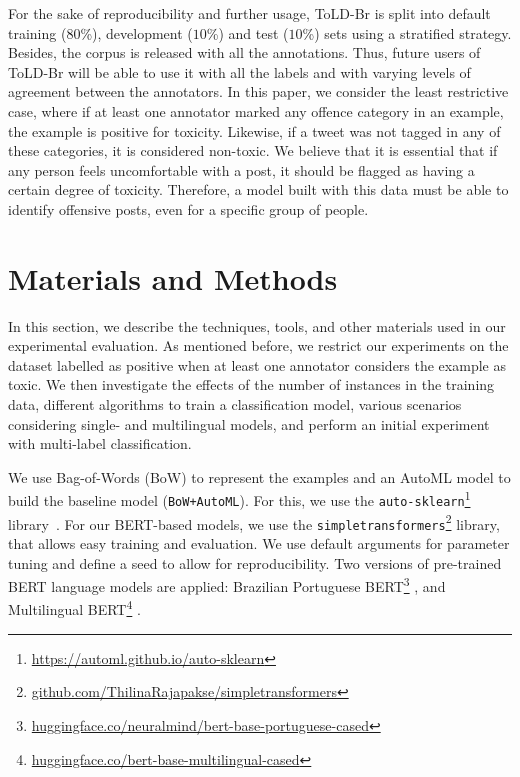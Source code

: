 \documentclass[11pt,a4paper]{article}
\begin{document}
For the sake of reproducibility and further usage, ToLD-Br is split into default training ($80$\%), development ($10$\%) and test ($10$\%) sets using a stratified strategy. Besides, the corpus is released with all the annotations. Thus, future users of ToLD-Br will be able to use it with all the labels and with varying levels of agreement between the annotators. In this paper, we consider the least restrictive case, where if at least one annotator marked any offence category in an example, the example is positive for toxicity. Likewise, if a tweet was not tagged in any of these categories, it is considered non-toxic. We believe that it is essential that if any person feels uncomfortable with a post, it should be flagged as having a certain degree of toxicity. Therefore, a model built with this data must be able to identify offensive posts, even for a specific group of people.

\section{Materials and Methods} \label{sec:materials}


In this section, we describe the techniques, tools, and other materials used in our experimental evaluation. As mentioned before, we restrict our experiments on the dataset labelled as positive when at least one annotator considers the example as toxic. We then investigate the effects of the number of instances in the training data, different algorithms to train a classification model, various scenarios considering single- and multilingual models, and perform an initial experiment with multi-label classification. 

We use Bag-of-Words (BoW) to represent the examples and an AutoML model to build the baseline model (\texttt{BoW+AutoML}). For this, we use the \texttt{auto-sklearn}\footnote{\url{https://automl.github.io/auto-sklearn}} library~\cite{feurer2019auto}. For our BERT-based models, we use the \texttt{simpletransformers}\footnote{\url{github.com/ThilinaRajapakse/simpletransformers}} library, that allows easy training and evaluation. We use default arguments for parameter tuning and define a seed to allow for reproducibility. Two versions of pre-trained BERT language models are applied: Brazilian Portuguese BERT\footnote{\url{huggingface.co/neuralmind/bert-base-portuguese-cased}} \cite{souza2019portuguese}, and Multilingual BERT\footnote{\url{huggingface.co/bert-base-multilingual-cased}} \cite{Wolf2019HuggingFacesTS}.
\end{document}
